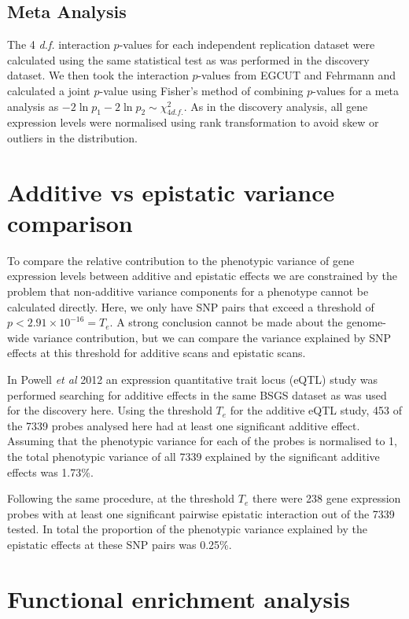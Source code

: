 \documentclass{article}
\begin{document}
\subsection{Meta Analysis}

The 4 \emph{d.f.} interaction $p$-values for each independent replication dataset were calculated using the same statistical test as was performed in the discovery dataset. We then took the interaction $p$-values from EGCUT and Fehrmann and calculated a joint $p$-value using Fisher's method of combining $p$-values for a meta analysis as $-2 \ln p_{1} - 2 \ln p_{2} \sim \chi^{2}_{4 d.f.}$. As in the discovery analysis, all gene expression levels were normalised using rank transformation to avoid skew or outliers in the distribution.



\section{Additive vs epistatic variance comparison}

To compare the relative contribution to the phenotypic variance of gene expression levels between additive and epistatic effects we are constrained by the problem that non-additive variance components for a phenotype cannot be calculated directly. Here, we only have SNP pairs that exceed a threshold of $p < 2.91 \times 10^{-16} = T_{e}$. A strong conclusion cannot be made about the genome-wide variance contribution, but we can compare the variance explained by SNP effects at this threshold for additive scans and epistatic scans. 

In Powell \emph{et al} 2012 \cite{Powell2012} an expression quantitative trait locus (eQTL) study was performed searching for additive effects in the same BSGS dataset as was used for the discovery here. Using the threshold $T_{e}$ for the additive eQTL study, 453 of the 7339 probes analysed here had at least one significant additive effect. Assuming that the phenotypic variance for each of the probes is normalised to 1, the total phenotypic variance of all 7339 explained by the significant additive effects was 1.73\%.

Following the same procedure, at the threshold $T_{e}$ there were 238 gene expression probes with at least one significant pairwise epistatic interaction out of the 7339 tested. In total the proportion of the phenotypic variance explained by the epistatic effects at these SNP pairs was 0.25\%.


\section{Functional enrichment analysis}
\end{document}
